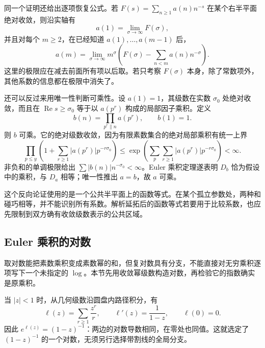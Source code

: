 同一个证明还给出逐项恢复公式。若 \(F(s)=\sum_{n\ge1}a(n)n^{-s}\) 在某个右半平面绝对收敛，则沿实轴有
\[
 a(1)=\lim_{\sigma\to\infty}F(\sigma),
\]
并且对每个 \(m\ge2\)，在已经知道 \(a(1),\ldots,a(m-1)\) 后，
\begin{equation}\label{b3:eq:25-coefficient-recovery}
 a(m)=\lim_{\sigma\to\infty}
 m^\sigma\left(F(\sigma)-\sum_{n<m}a(n)n^{-\sigma}\right).
\end{equation}
这里的极限应在减去前面所有项以后取。若只考察 \(F(\sigma)\) 本身，除了常数项外，其他系数的信息都在极限中消失了。

还可以反过来用唯一性判断可乘性。设 \(a(1)=1\)，其级数在实数 \(\sigma_0\) 处绝对收敛，而且在 \(\operatorname{Re}s\ge\sigma_0\) 等于以 \(a(p^r)\) 构成的局部因子乘积。定义
\[
 b(n)=\prod_{p^r\parallel n}a(p^r),\qquad b(1)=1.
\]
则 \(b\) 可乘。它的绝对级数收敛，因为有限素数集合的绝对局部乘积有统一上界
\[
 \prod_{p\le y}\left(1+\sum_{r\ge1}|a(p^r)|p^{-r\sigma_0}\right)
 \le\exp\left(\sum_p\sum_{r\ge1}|a(p^r)|p^{-r\sigma_0}\right)<\infty.
\]
非负和的单调极限给出 \(\sum|b(n)|n^{-\sigma_0}<\infty\)。Euler 乘积定理遂表明 \(D_b\) 恰为假设中的乘积，与 \(D_a\) 相等；唯一性推出 \(a=b\)，故 \(a\) 可乘。

这个反向论证使用的是一个公共半平面上的函数等式。在某个孤立参数处，两种和碰巧相等，并不能识别所有系数。解析延拓后的函数等式若要用于比较系数，也应先限制到双方确有收敛级数表示的公共区域。

\subsection{Euler 乘积的对数}
\label{b3:subsec:250503}

取对数能把素数乘积变成素数幂的和，但复对数具有分支，不能直接对无穷乘积逐项写下一个未指定的 \(\log\)。本节先用收敛幂级数构造对数，再检验它的指数确实是原乘积。

当 \(|z|<1\) 时，从几何级数沿圆盘内路径积分，有
\[
 \ell(z)=\sum_{r\ge1}\frac{z^r}{r},\qquad
 \ell'(z)=\frac1{1-z},\qquad \ell(0)=0.
\]
因此 \(e^{\ell(z)}=(1-z)^{-1}\)：两边的对数导数相同，在零处也同值。这就选定了 \((1-z)^{-1}\) 的一个对数，无须另行选择带割线的全局分支。

